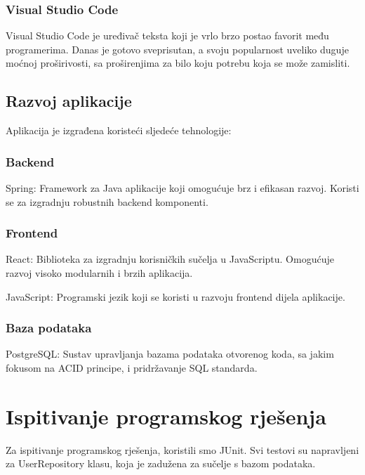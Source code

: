 \subsubsection{Visual Studio Code}
Visual Studio Code je uređivač teksta koji je vrlo brzo postao favorit među
programerima. Danas je gotovo sveprisutan, a svoju popularnost uveliko
duguje moćnoj proširivosti, sa proširenjima za bilo koju potrebu koja se
može zamisliti.

\subsection{Razvoj aplikacije}

Aplikacija je izgrađena koristeći sljedeće tehnologije:

\subsubsection{Backend}

Spring: Framework za Java aplikacije koji omogućuje brz i efikasan razvoj. 
Koristi se za izgradnju robustnih backend komponenti.

\subsubsection{Frontend}

React: Biblioteka za izgradnju korisničkih sučelja u JavaScriptu. Omogućuje 
razvoj visoko modularnih i brzih aplikacija.

JavaScript: Programski jezik koji se koristi u razvoju frontend dijela 
aplikacije.

\subsubsection{Baza podataka}

PostgreSQL: Sustav upravljanja bazama podataka otvorenog koda, sa jakim 
fokusom na ACID principe, i pridržavanje SQL standarda.
			
			
			\eject 
		
	
		\section{Ispitivanje programskog rješenja}
		
Za ispitivanje programskog rješenja, koristili smo JUnit. Svi testovi su 
napravljeni za UserRepository klasu, koja je zadužena za sučelje s bazom 
podataka.

